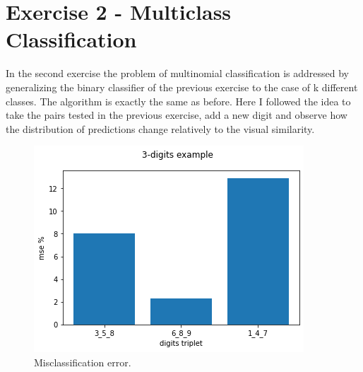 \documentclass[a4paper,10pt]{report}
\begin{document}
\chapter{Exercise 2 - Multiclass Classification}\label{chap:ex2}
In the second exercise the problem of multinomial classification is addressed by generalizing the binary classifier of the previous exercise to the case of k different classes.
The algorithm is exactly the same as before.
Here I followed the idea to take the pairs tested in the previous exercise, add a new digit and observe how the distribution of predictions change relatively to the visual similarity.
\begin{figure}[h]
  \center
  \includegraphics[width=0.45\linewidth]{multiclass_cls_mse.png}
  \caption{Misclassification error.}
  \label{fig:multiclass_cls_mse}
\end{figure}
\end{document}
